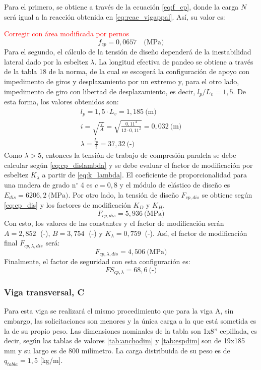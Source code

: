Para el primero, se obtiene a través de la ecuación \ref{eq:f_cp}, donde la carga $N$ será igual a la reacción obtenida en \ref{eq:reac_vigappal}. Así, su valor es:

\textcolor{red}{Corregir con área modificada por pernos}
\begin{equation}
	f_{cp} = 0,0657 \quad \text{(MPa)} 
\end{equation}
Para el segundo, el cálculo de la tensión de diseño dependerá de la inestabilidad lateral dado por la esbeltez $\lambda$. La longitud efectiva de pandeo se obtiene a través de la tabla 18 de la norma, de la cual se escogerá la configuración de apoyo con impedimento de giros y desplazamiento por un extremo y, para el otro lado, impedimento de giro con libertad de desplazamiento, es decir, $l_p/L_v = 1,5$. De esta forma, los valores obtenidos son:
\begin{gather*}
	l_p = 1,5\cdot L_v = 1,185 \: \text{(m)}\\
	i = \sqrt{\frac{I}{A}} = \sqrt{\frac{0,11^4}{12\cdot 0,11^2}} = 0,032 \: \text{(m)}\\
	\lambda = \frac{l_p}{i} = 37,32 \: \text{(-)}
\end{gather*}
Como $\lambda > 5$, entonces la tensión de trabajo de compresión paralela se debe calcular según \ref{eq:cp_dislambda} y se debe evaluar el factor de modificación por esbeltez $K_{\lambda}$ a partir de \ref{eq:k_lambda}. El coeficiente de proporcionalidad para una madera de grado n$^{\circ}$ 4 es $c = 0,8$ y el módulo de elástico de diseño es $E_{dis} = 6206,2\: \text{(MPa)}$. Por otro lado, la tensión de diseño $F_{cp,dis}$ se obtiene según \ref{eq:cp_dis} y los factores de modificación $K_D$ y $K_H$.
\begin{equation}
	F_{cp,dis} = 5,936 \: \text{(MPa)}
\end{equation}
Con esto, los valores de las constantes y el factor de modificación serán $A = 2,852\;$ (-), $B = 3,754\;$ (-) y $K_{\lambda} = 0,759\:$ (-). Así, el factor de modificación final $F_{cp,\lambda, dis}$ será:
\begin{equation}
	F_{cp,\lambda, dis} = 4,506 \: \text{(MPa)}
\end{equation}
Finalmente, el factor de seguridad con esta configuración es:
\begin{equation}
	FS_{cp,\lambda} = 68,6\: \text{(-)}
\end{equation}

\subsubsection{Viga transversal, C}
Para esta viga se realizará el mismo procedimiento que para la viga A, sin embargo, las solicitaciones son menores y la única carga a la que está sometida es la de su propio peso. Las dimensiones nominales de la tabla son 1x8'' cepillada, es decir, según las tablas de valores \ref{tab:anchodim} y \ref{tab:espdim} son de 19x185 mm y su largo es de 800 milímetro. La carga distribuida de su peso es de $q_{tabla}=1,5$ [kg/m].

